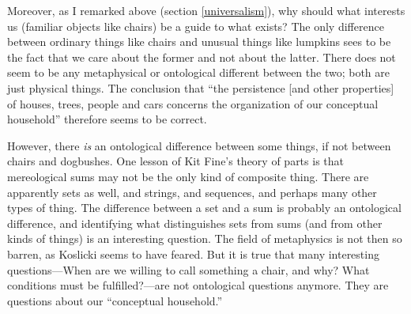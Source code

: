 \documentclass[11pt]{article}
\begin{document}
\begin{spacing}{1.5}
Moreover, as I remarked above (section \ref{universalism}), why should
what interests us (familiar objects like chairs) be a guide to what
exists?  The only difference between ordinary things like chairs and
unusual things like lumpkins sees to be the fact that we care about
the former and not about the latter.  There does not seem to be any
metaphysical or ontological different between the two; both are just
physical things.  The conclusion that ``the persistence [and other
  properties] of houses, trees, people and cars concerns the
organization of our conceptual household'' therefore seems to be
correct.

However, there {\em is} an ontological difference between some things,
if not between chairs and dogbushes.  One lesson of Kit Fine's theory
of parts is that mereological sums may not be the only kind of
composite thing.  There are apparently sets as well, and strings, and
sequences, and perhaps many other types of thing.  The difference
between a set and a sum is probably an ontological difference, and
identifying what distinguishes sets from sums (and from other kinds of
things) is an interesting question.  The field of metaphysics is not
then so barren, as Koslicki seems to have feared.  But it is true that
many interesting questions---When are we willing to call something a
chair, and why?  What conditions must be fulfilled?---are not
ontological questions anymore.  They are questions about our
``conceptual household.''

\ifstandalone
\end{spacing}


\fi
\end{document}

